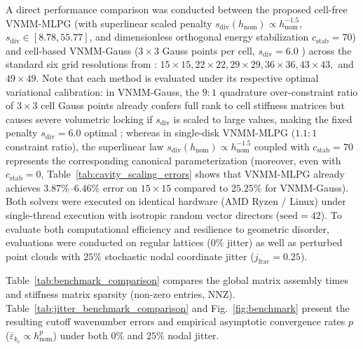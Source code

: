 \documentclass[VANCOUVER,Times1COL]{WileyNJD-v5}
\begin{document}
A direct performance comparison was conducted between the proposed cell-free VNMM-MLPG (with superlinear scaled penalty $s_{\mathrm{div}}(h_{\mathrm{nom}}) \propto h_{\mathrm{nom}}^{-1.5}$, $s_{\mathrm{div}} \in [8.78, 55.77]$, and dimensionless orthogonal energy stabilization $c_{\mathrm{stab}} = 70$) and cell-based VNMM-Gauss ($3 \times 3$ Gauss points per cell, $s_{\mathrm{div}} = 6.0$ \cite{stable_vnmm2d_2026}) across the standard six grid resolutions from \cite{stable_vnmm2d_2026}: $15 \times 15, 22 \times 22, 29 \times 29, 36 \times 36, 43 \times 43,$ and $49 \times 49$. Note that each method is evaluated under its respective optimal variational calibration: in VNMM-Gauss, the $9:1$ quadrature over-constraint ratio of $3\times 3$ cell Gauss points already confers full rank to cell stiffness matrices but causes severe volumetric locking if $s_{\mathrm{div}}$ is scaled to large values, making the fixed penalty $s_{\mathrm{div}} = 6.0$ optimal \cite{stable_vnmm2d_2026}; whereas in single-disk VNMM-MLPG ($1.1:1$ constraint ratio), the superlinear law $s_{\mathrm{div}}(h_{\mathrm{nom}}) \propto h_{\mathrm{nom}}^{-1.5}$ coupled with $c_{\mathrm{stab}} = 70$ represents the corresponding canonical parameterization (moreover, even with $c_{\mathrm{stab}} = 0$, Table~\ref{tab:cavity_scaling_errors} shows that VNMM-MLPG already achieves $3.87\%\text{--}6.46\%$ error on $15\times 15$ compared to $25.25\%$ for VNMM-Gauss). Both solvers were executed on identical hardware (AMD Ryzen / Linux) under single-thread execution with isotropic random vector directors ($\text{seed}=42$). To evaluate both computational efficiency and resilience to geometric disorder, evaluations were conducted on regular lattices ($0\%$ jitter) as well as perturbed point clouds with $25\%$ stochastic nodal coordinate jitter ($j_{\mathrm{frac}} = 0.25$).

Table~\ref{tab:benchmark_comparison} compares the global matrix assembly times and stiffness matrix sparsity (non-zero entries, NNZ). Table~\ref{tab:jitter_benchmark_comparison} and Fig.~\ref{fig:benchmark} present the resulting cutoff wavenumber errors and empirical asymptotic convergence rates $p$ ($\overline{\varepsilon}_{k_c} \propto h_{\mathrm{nom}}^p$) under both $0\%$ and $25\%$ nodal jitter.
\end{document}
